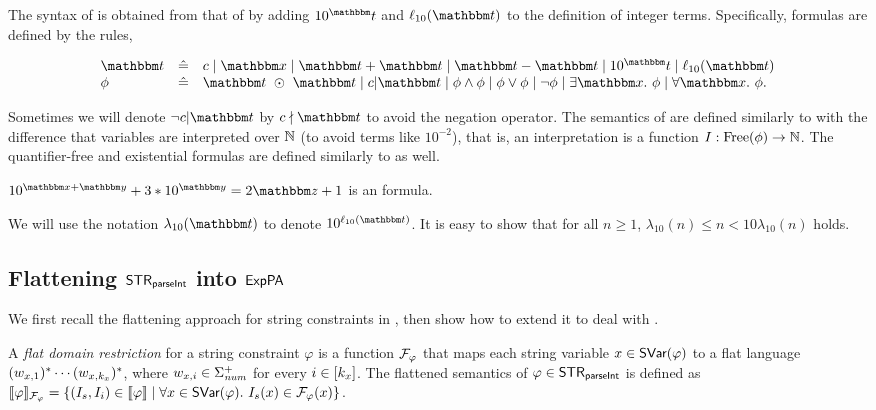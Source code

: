 The syntax of {\paexp} is obtained from that of {\pa} by adding $10^\iterm$ and $\ell_{10}(\iterm)$ to the definition of integer terms. Specifically, {\paexp} formulas are defined by the rules,

$$
\begin{array}{ l c l}
\iterm &\Def& c \mid \ivarx \mid \iterm + \iterm \mid \iterm - \iterm \mid 10^\iterm \mid \ell_{10}(\iterm) \\
\phi &\Def & \iterm \ \op\ \iterm \mid c \vert \iterm \mid \phi \wedge \phi \mid \phi \vee \phi \mid \neg \phi \mid \exists \ivarx.\ \phi \mid \forall \ivarx.\ \phi.
\end{array}
$$

Sometimes we will denote $\neg c \vert \iterm$ by $c\nmid \iterm$ to avoid the negation operator. The semantics of {\paexp} are defined similarly to {\pa} with the difference that variables are interpreted over $\mathbb{N}$ (to avoid terms like $10^{-2}$), that is, an interpretation is a function $I: \mathrm{Free}(\phi) \rightarrow \mathbb{N}$. The quantifier-free and existential {\paexp} formulas are defined similarly to {\pa} as well.

\begin{example}
$10^{\ivarx+ \ivary} + 3 * 10^{\ivary}  = 2 \ivarz +1 $ is an {\paexp} formula.
\end{example} 
 
We will use the notation $\lambda_{10}(\iterm)$ to denote $10^{\ell_{10}(\iterm)}$. It is easy to show that for all $n \ge 1$, $\lambda_{10}(n) \le n < 10\lambda_{10}(n)$ holds.

\subsection{Flattening ${\sf STR}_{\textsf{parseInt}}$ into ${\sf ExpPA}$}

We first recall the flattening approach for string constraints in \cite{Parosh:20:PLDI}, then show how to extend it to deal with {\parseInt}.

A \emph{flat domain restriction} for a string constraint $\varphi$ is a function $\mathcal{F}_\varphi$ that maps each string variable $x \in \textsf{SVar}(\varphi)$ to a flat language $(w_{x,1})^* \cdots (w_{x, k_x})^*$, where $w_{x, i} \in \Sigma_{\textit{num}}^+$ for every $i \in [k_x]$. 
%
The flattened semantics of $\varphi \in {\sf STR}_{\textsf{parseInt}}$ is defined as $\llbracket \varphi \rrbracket_{\mathcal{F}_\varphi} = \{(I_s, I_i) \in \llbracket \varphi  \rrbracket \mid \forall x \in \textsf{SVar}(\varphi).\ I_s(x) \in  \mathcal{F}_\varphi(x)\}$.  

